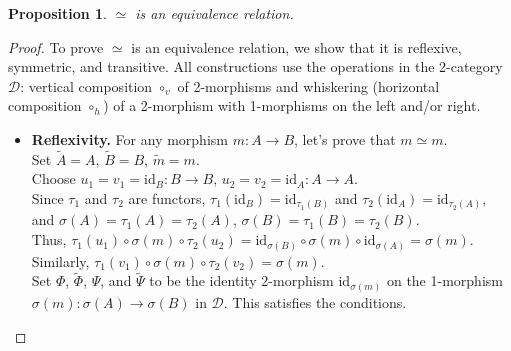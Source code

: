 \documentclass[a4paper,10pt]{article}
\theoremstyle{plain}
\newtheorem{proposition}[theorem]{Proposition}
\theoremstyle{definition}
\theoremstyle{remark}
\begin{document}
\begin{proposition}
  $\simeq$ is an equivalence relation.
\end{proposition}

\begin{proof}
  To prove \(\simeq\) is an equivalence relation, we show that it is reflexive, symmetric, and transitive. All constructions use the operations in the 2-category \(\mathcal{D}\): vertical composition \(\circ_v\) of 2-morphisms and whiskering (horizontal composition $\circ_h$) of a 2-morphism with 1-morphisms on the left and/or right.
  \begin{itemize}
    \item \textbf{Reflexivity.} For any morphism \(m: A \to B\), let's prove that \(m \simeq m\). \\
          Set \(\tilde{A} = A\), \(\tilde{B} = B\), \(\tilde{m} = m\). \\
          Choose \(u_1 = v_1 = \mathrm{id}_B: B \to B\), \(u_2 = v_2 = \mathrm{id}_A: A \to A\). \\
          Since \(\tau_1\) and \(\tau_2\) are functors, \(\tau_1(\mathrm{id}_B) = \mathrm{id}_{\tau_1(B)}\) and \(\tau_2(\mathrm{id}_A) = \mathrm{id}_{\tau_2(A)}\), and \(\sigma(A) = \tau_1(A) = \tau_2(A)\), \(\sigma(B) = \tau_1(B) = \tau_2(B)\).  \\
          Thus, \(\tau_1(u_1) \circ \sigma(m) \circ \tau_2(u_2) = \mathrm{id}_{\sigma(B)} \circ \sigma(m) \circ \mathrm{id}_{\sigma(A)} = \sigma(m)\). \\
          Similarly, \(\tau_1(v_1) \circ \sigma(m) \circ \tau_2(v_2) = \sigma(m)\). \\
          Set \(\Phi\), \(\tilde{\Phi}\), \(\Psi\), and \(\tilde{\Psi}\) to be the identity 2-morphism \(\mathrm{id}_{\sigma(m)}\) on the 1-morphism \(\sigma(m): \sigma(A) \to \sigma(B)\) in \(\mathcal{D}\).
          This satisfies the conditions.


\end{itemize}
\end{proof}
\end{document}

